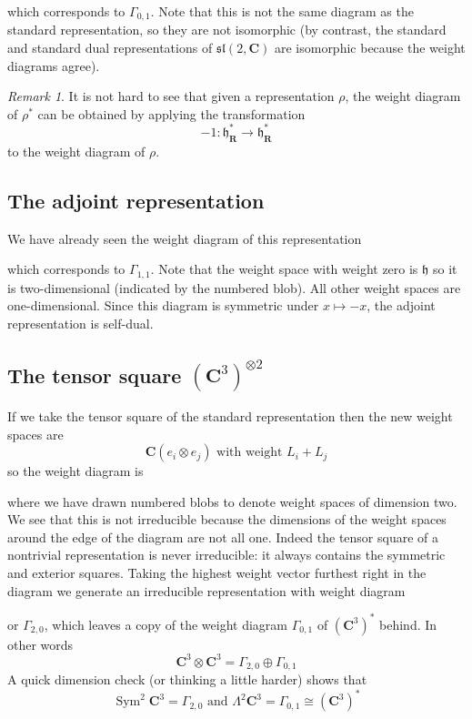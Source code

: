 \documentclass[12pt]{article}
\newcommand{\CC}{\mathbf{C}}
\newcommand{\RR}{\mathbf{R}}
\newcommand{\OP}{\operatorname}
\newcommand{\Sym}{\OP{Sym}}
\theoremstyle{definition}
\theoremstyle{check}
\theoremstyle{remark}
\newtheorem{rmk}[thm]{Remark}
\theoremstyle{TheoremNum}
\begin{document}
\slthreedual

which corresponds to $\Gamma_{0,1}$. Note that this is not the same diagram as the standard representation, so they are not isomorphic (by contrast, the standard and standard dual representations of $\mathfrak{sl}(2,\CC)$ are isomorphic because the weight diagrams agree).

\begin{rmk}
It is not hard to see that given a representation $\rho$, the weight diagram of $\rho^*$ can be obtained by applying the transformation
\[-1\colon\mathfrak{h}^*_{\RR}\to\mathfrak{h}^*_{\RR}\]
to the weight diagram of $\rho$.
\end{rmk}

\subsection{The adjoint representation}

We have already seen the weight diagram of this representation

\sladjwt

which corresponds to $\Gamma_{1,1}$. Note that the weight space with weight zero is $\mathfrak{h}$ so it is two-dimensional (indicated by the numbered blob). All other weight spaces are one-dimensional. Since this diagram is symmetric under $x\mapsto -x$, the adjoint representation is self-dual.

\subsection{The tensor square $(\CC^3)^{\otimes 2}$}

If we take the tensor square of the standard representation then the new weight spaces are
\[\CC (e_i\otimes e_j)\mbox{ with weight }L_i+L_j\]
so the weight diagram is


where we have drawn numbered blobs to denote weight spaces of dimension two. We see that this is not irreducible because the dimensions of the weight spaces around the edge of the diagram are not all one. Indeed the tensor square of a nontrivial representation is never irreducible: it always contains the symmetric and exterior squares. Taking the highest weight vector furthest right in the diagram we generate an irreducible representation with weight diagram


or $\Gamma_{2,0}$, which leaves a copy of the weight diagram $\Gamma_{0,1}$ of $(\CC^3)^*$ behind. In other words
\[\CC^3\otimes\CC^3=\Gamma_{2,0}\oplus\Gamma_{0,1}\]
A quick dimension check (or thinking a little harder) shows that
\[\Sym^2\CC^3=\Gamma_{2,0}\mbox{ and }\Lambda^2\CC^3=\Gamma_{0,1}\cong(\CC^3)^*\]
\end{document}
